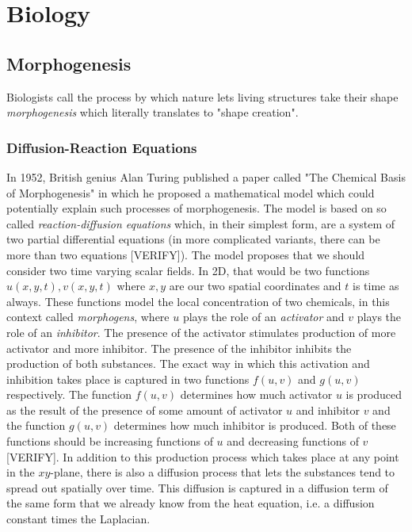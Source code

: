 \section{Biology}

\subsection{Morphogenesis}
Biologists call the process by which nature lets living structures take their shape \emph{morphogenesis} which literally translates to "shape creation". 





\subsubsection{Diffusion-Reaction Equations} In 1952, British genius Alan Turing published a paper called "The Chemical Basis of Morphogenesis" in which he proposed a mathematical model which could potentially explain such processes of morphogenesis. The model is based on so called \emph{reaction-diffusion equations} which, in their simplest form, are a system of two partial differential equations (in more complicated variants, there can be more than two equations [VERIFY]). The model proposes that we should consider two time varying scalar fields. In 2D, that would be two functions $u(x,y,t), v(x,y,t)$ where $x,y$ are our two spatial coordinates and $t$ is time as always. These functions model the local concentration of two chemicals, in this context called \emph{morphogens}, where $u$ plays the role of an \emph{activator} and $v$ plays the role of an \emph{inhibitor}. The presence of the activator stimulates production of more activator and more inhibitor. The presence of the inhibitor inhibits the production of both substances. The exact way in which this activation and inhibition takes place is captured in two functions $f(u,v)$ and $g(u,v)$ respectively. The function $f(u,v)$ determines how much activator $u$ is produced as the result of the presence of some amount of activator $u$ and inhibitor $v$ and the function $g(u,v)$ determines how much inhibitor is produced. Both of these functions should be increasing functions of $u$ and decreasing functions of $v$ [VERIFY]. In addition to this production process which takes place at any point in the $xy$-plane, there is also a diffusion process that lets the substances tend to spread out spatially over time. This diffusion is captured in a diffusion term of the same form that we already know from the heat equation, i.e. a diffusion constant times the Laplacian.





